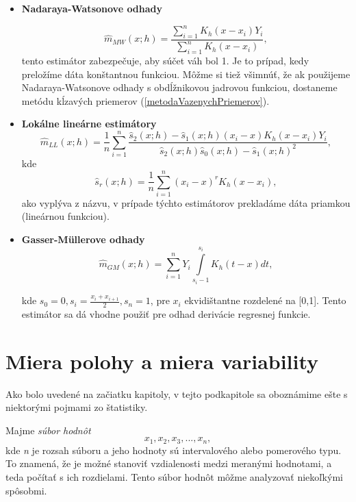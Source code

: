 \begin{itemize}
\item  \textbf{Nadaraya-Watsonove odhady}

\begin{equation*}
\hat{m}_{MW}(x;h) = \frac{\sum\limits_{i=1}^{n} K_h(x - x_i)Y_i}{\sum\limits_{i=1}^{n} K_h(x - x_i)},
\end{equation*}
tento estimátor zabezpečuje, aby súčet váh bol 1. Je to prípad, kedy preložíme dáta konštantnou funkciou. Môžme si tiež všimnúť, že ak použijeme Nadaraya-Watsonove odhady s obdĺžnikovou jadrovou funkciou, dostaneme metódu kĺzavých priemerov (\ref{metodaVazenychPriemerov}).

\item
 \textbf{Lokálne lineárne estimátory}
\begin{equation*}
\hat{m}_{LL}(x;h) = \frac{1}{n}\sum\limits_{i=1}^{n}\frac{{\hat{s}_2(x;h) - \hat{s}_1(x;h)(x_i - x)}K_h(x-x_i)Y_i}{\hat{s}_2(x;h)\hat{s}_0(x;h) - \hat{s}_1(x;h)^2},
\end{equation*}
kde 
\begin{equation*}
\hat{s}_r(x;h) = \frac{1}{n}\sum\limits_{i=1}^{n}(x_i - x)^rK_h(x-x_i),
\end{equation*}
ako vyplýva z názvu, v prípade týchto estimátorov prekladáme dáta priamkou (lineárnou funkciou).

\item
\textbf{Gasser-Müllerove odhady}
\begin{equation*}
\hat{m}_{GM}(x;h) = \sum\limits_{i=1}^{n} Y_i \int\limits_{s_i-1}^{s_i}K_h(t-x)dt,
\end{equation*}

kde $s_0 = 0 , s_i = \frac{x_i + x_{i+1}}{2}, s_n = 1$, pre $x_i$ ekvidištantne rozdelené na [0,1]. Tento estimátor sa dá vhodne použiť pre odhad derivácie regresnej funkcie.

\end{itemize}


\section{Miera polohy a miera variability}
Ako bolo uvedené na začiatku kapitoly, v tejto podkapitole sa oboznámime ešte s niektorými pojmami zo štatistiky.

Majme \textit{súbor hodnôt}
 \begin{equation}
x_1,x_2,x_3,...,x_n,
\end{equation}  
kde \textit{n} je rozsah súboru a jeho hodnoty sú intervalového alebo pomerového typu. To znamená, že je možné  stanoviť vzdialenosti medzi meranými hodnotami, a teda počítať s ich rozdielami. Tento súbor hodnôt môžme analyzovať niekoľkými spôsobmi.

